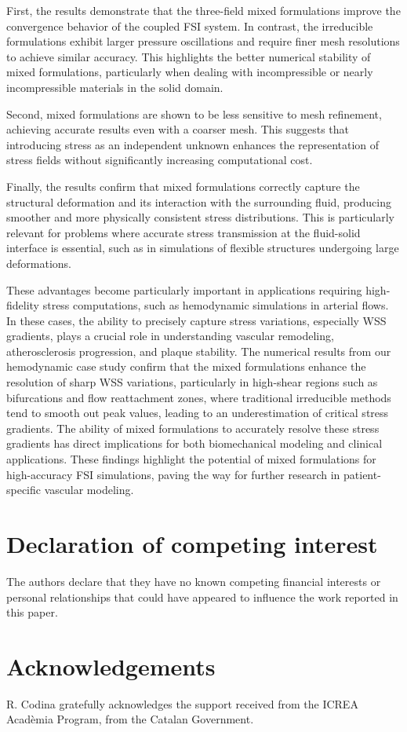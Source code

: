 \documentclass[11pt,english]{article}
\begin{document}
First, the results demonstrate that the three-field mixed formulations improve the convergence behavior of the coupled FSI system. In contrast, the irreducible formulations exhibit larger pressure oscillations and require finer mesh resolutions to achieve similar accuracy. This highlights the better numerical stability of mixed formulations, particularly when dealing with incompressible or nearly incompressible materials in the solid domain. 

Second, mixed formulations are shown to be less sensitive to mesh refinement, achieving accurate results even with a coarser mesh. This suggests that introducing stress as an independent unknown enhances the representation of stress fields without significantly increasing computational cost. 

Finally, the results confirm that mixed formulations correctly capture the structural deformation and its interaction with the surrounding fluid, producing smoother and more physically consistent stress distributions. This is particularly relevant for problems where accurate stress transmission at the fluid-solid interface is essential, such as in simulations of flexible structures undergoing large deformations.

These advantages become particularly important in applications requiring high-fidelity stress computations, such as hemodynamic simulations in arterial flows. In these cases, the ability to precisely capture stress variations, especially WSS gradients, plays a crucial role in understanding vascular remodeling, atherosclerosis progression, and plaque stability. The numerical results from our hemodynamic case study confirm that the mixed formulations enhance the resolution of sharp WSS variations, particularly in high-shear regions such as bifurcations and flow reattachment zones, where traditional irreducible methods tend to smooth out peak values, leading to an underestimation of critical stress gradients. The ability of mixed formulations to accurately resolve these stress gradients has direct implications for both biomechanical modeling and clinical applications. These findings highlight the potential of mixed formulations for high-accuracy FSI simulations, paving the way for further research in patient-specific vascular modeling.

\section*{Declaration of competing interest}

The authors declare that they have no known competing financial interests or personal relationships that could have appeared to influence the work reported in this paper.

\section*{Acknowledgements}

R. Codina gratefully acknowledges the support received from the ICREA Acad\`emia Program, from the Catalan Government.
               


\end{document}
